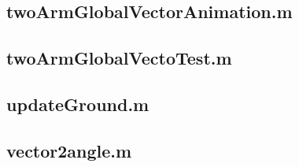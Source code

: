 \documentclass[11pt]{article}
\begin{document}
\subsection{twoArmGlobalVectorAnimation.m}


\subsection{twoArmGlobalVectoTest.m}


\subsection{updateGround.m}


\subsection{vector2angle.m}

\end{document}
